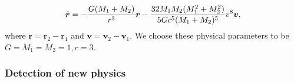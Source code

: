 \documentclass[aps,pre,reprint,superscriptaddress,nofootinbib,amsmath,amssymb]{revtex4-2}
\newcommand{\rvec}{\boldsymbol{r}}
\newcommand{\vvec}{\boldsymbol{v}}
\def\beq#1{\begin{equation}\label{#1}}
\def\eeq{\end{equation}}
\begin{document}
\beq{InspiralEq_acc}
\ddot{\rvec} = -{G(M_1+M_2)\over r^3}\rvec -\frac{32M_1M_2(M_1^2+M_2^2)}{5Gc^5(M_1+M_2)^5} v^8\vvec,
\eeq
where $\rvec=\rvec_2-\rvec_1$ and $\vvec=\vvec_2-\vvec_1$. We choose these physical parameters to be $G=M_1=M_2=1, c=3$.



\begin{comment}
{\bf ``Dark Matter"} Many populations of ``dark" physical objects have been discovered via their gravitational interactions alone. On one extreme, we have individual objects such as the above-mentioned Neptune example as well as exoplanets, massive compact halo objects (MACHOs) discoovered through gravitational microlensing, and quiescent black holes orbited a visible companion star. On the other extreme, we have cosmological dark matter, which is typically modeled as particles so numerous that they can be approximated as a smoothly varying density field.
Our fourth numerical experiment tackles an intermediate situation with 
$N_v=40$ visible particles gravitationally interacting with each other and  $N_d=216$ ``dark" particles, to see if the latter can be auto-discovered from their exertion of non-conservative forces on the former.

To avoid numerical instabilities, we replace the gravitational $r^{-1}$-potential  by the softened non-singular version
\beq{SoftenedPotentialEq}
U(r) =\left\{
\begin{tabular}{lll}
$\frac{1}{2}r^2$		&if&$r\leq 1$,\\
$2-r^{-1}$			&for&$r\geq 1.$
\end{tabular}
\right.
\eeq
We initialize our N-body simulation of the $N=N_v+N_d=256$ particles (all of mass $m=1$) by placing them at rest
on a 2-dimensional $16\times 16$ grid with spacing $\Delta x=\Delta y=1$ and adding a random perturbation to each position drawn from a Gaussian distribution with standard deviation 0.2. $N_d=216$  of these particles are randomly assigned to be the ``dark'' ones, and the simulated trajectories of the remaining 40 used taken as the input to NNPhD, discarding the dark particle trajectories.\footnote{Cosmological measurements suggest that dark and baryonic matter constitute about 27\% and 5\% of our cosmic mass density \cite{nasa}; our simulation has that same ratio $216/40=27\%/5\% = 5.4$ of dark to visible matter.}

\end{comment}


\subsubsection{Detection of new physics}\label{sec:detection_subsec}
\end{document}
